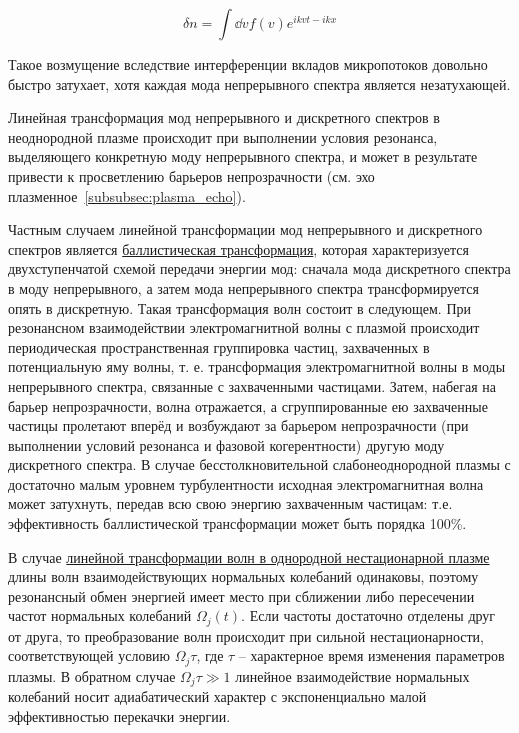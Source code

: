 \documentclass[10pt, a4paper]{article}
\begin{document}
\begin{equation*}
	\delta n = \int \dd{v} f(v) e^{ikvt-ikx}
\end{equation*}

Такое возмущение вследствие интерференции вкладов микропотоков довольно быстро затухает, хотя каждая мода непрерывного спектра является незатухающей.

Линейная трансформация мод непрерывного и дискретного спектров в неоднородной плазме происходит при выполнении условия резонанса, выделяющего конкретную моду непрерывного спектра, и может в результате привести к просветлению барьеров непрозрачности (см. эхо плазменное~\ref{subsubsec:plasma_echo}).

Частным случаем линейной трансформации мод непрерывного и дискретного спектров является \uline{баллистическая трансформация}, которая характеризуется двухступенчатой схемой передачи энергии мод: сначала мода дискретного спектра в моду непрерывного, а затем мода непрерывного спектра трансформируется опять в дискретную. Такая трансформация волн состоит в следующем. При резонансном взаимодействии электромагнитной волны с плазмой происходит периодическая пространственная группировка частиц, захваченных в потенциальную яму волны, т. е. трансформация электромагнитной волны в моды непрерывного спектра, связанные с захваченными частицами. Затем, набегая на барьер непрозрачности, волна отражается, а сгруппированные ею захваченные частицы пролетают вперёд и возбуждают за барьером непрозрачности (при выполнении условий резонанса и фазовой когерентности) другую моду дискретного спектра. В случае бесстолкновительной слабонеоднородной плазмы с достаточно малым уровнем турбулентности исходная электромагнитная волна может затухнуть, передав всю свою энергию захваченным частицам: т.е. эффективность баллистической трансформации может быть порядка 100\%.

В случае \uline{линейной трансформации волн в однородной нестационарной плазме} длины волн взаимодействующих нормальных колебаний одинаковы, поэтому резонансный обмен энергией имеет место при сближении либо пересечении частот нормальных колебаний $\Omega_j(t)$. Если частоты достаточно отделены друг от друга, то преобразование волн происходит при сильной нестационарности, соответствующей условию $\Omega_j\tau$, где $\tau$ -- характерное время изменения параметров плазмы. В обратном случае $\Omega_j\tau\gg 1$ линейное взаимодействие нормальных колебаний носит адиабатический характер с экспоненциально малой эффективностью перекачки энергии.
\end{document}

